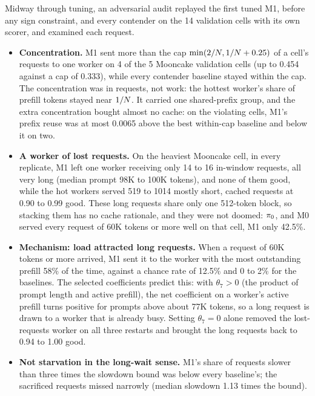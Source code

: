 Midway through tuning, an adversarial audit replayed the first tuned M1, before any sign constraint,
and every contender on the 14 validation cells with its own scorer, and examined each request.
\begin{itemize}
  \item \textbf{Concentration.} M1 sent more than the cap $\min(2/N, 1/N + 0.25)$ of a cell's
    requests to one worker on 4 of the 5 Mooncake validation cells (up to 0.454 against a cap of
    0.333), while every contender baseline stayed within the cap. The concentration was in requests,
    not work: the hottest worker's share of prefill tokens stayed near $1/N$. It carried one
    shared-prefix group, and the extra concentration bought almost no cache: on the violating cells,
    M1's prefix reuse was at most 0.0065 above the best within-cap baseline and below it on two.
  \item \textbf{A worker of lost requests.} On the heaviest Mooncake cell, in every replicate, M1 left
    one worker receiving only 14 to 16 in-window requests, all very long (median prompt 98K to 100K
    tokens), and none of them good, while the hot workers served 519 to \num{1014} mostly short,
    cached requests at 0.90 to 0.99 good. These long requests share only one 512-token block, so
    stacking them has no cache rationale, and they were not doomed: $\pi_{0}$,  and M0
    served every request of 60K tokens or more well on that cell, M1 only 42.5\%.
  \item \textbf{Mechanism: load attracted long requests.} When a request of 60K tokens or more
    arrived, M1 sent it to the worker with the most outstanding prefill 58\% of the time, against a
    chance rate of 12.5\% and 0 to 2\% for the baselines. The selected coefficients predict this:
    with $\theta_7 > 0$ (the product of prompt length and active prefill), the net coefficient on a
    worker's active prefill turns positive for prompts above about 77K tokens, so a long request is
    drawn to a worker that is already busy. Setting $\theta_7 = 0$ alone removed the lost-requests
    worker on all three restarts and brought the long requests back to 0.94 to 1.00 good.
  \item \textbf{Not starvation in the long-wait sense.} M1's share of requests slower than three
    times the slowdown bound was below every baseline's; the sacrificed requests missed narrowly
    (median slowdown 1.13 times the bound).
\end{itemize}
